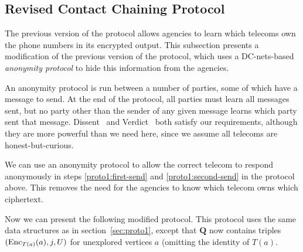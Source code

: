 \subsection{Revised Contact Chaining Protocol}
\label{sec:proto2}

The previous version of the protocol allows agencies to learn which telecoms own the phone numbers in its encrypted output. This subsection presents a modification of the previous version of the protocol, which uses a DC-nets-based \emph{anonymity protocol} to hide this information from the agencies.

An anonymity protocol is run between a number of parties, some of which have a message to send. At the end of the protocol, all parties must learn all messages sent, but no party other than the sender of any given message learns which party sent that message. Dissent~\cite{dissent} and Verdict~\cite{verdict} both satisfy our requirements, although they are more powerful than we need here, since we assume all telecoms are honest-but-curious.

We can use an anonymity protocol to allow the correct telecom to respond anonymously in steps \ref{proto1:first-send} and \ref{proto1:second-send} in the protocol above. This removes the need for the agencies to know which telecom owns which ciphertext.

Now we can present the following modified protocol. This protocol uses the same data structures as in section~\ref{sec:proto1}, except that $\mathbf{Q}$ now contains triples $(\operatorname{Enc}_{T(a)}(a), j, U)$ for unexplored vertices $a$ (omitting the identity of $T(a)$.

